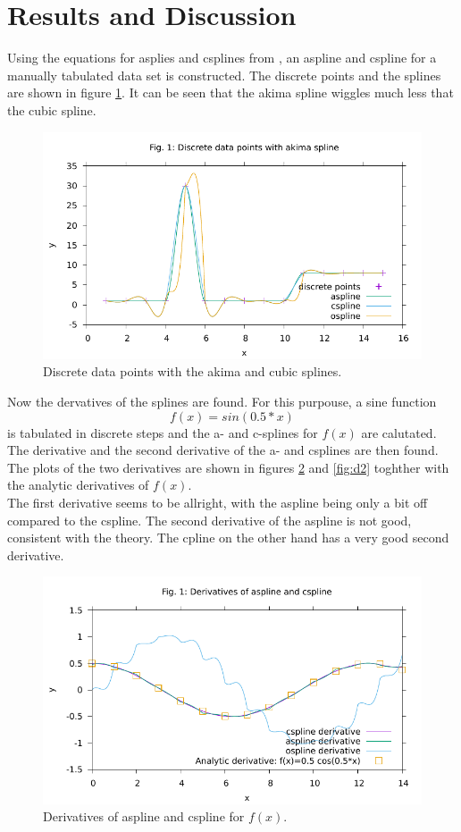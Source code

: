 \documentclass{article}
\begin{document}
\section{Results and Discussion}
Using the equations for asplies and csplines from \cite{Prakprog}, an aspline and cspline for a 
manually tabulated data set is constructed.
The discrete points and the splines are shown in figure \ref{fig:acspl}. It can be seen that the akima spline 
wiggles much less that the cubic spline.

\begin{figure}[h]
\label{fig:acspl}
\includegraphics[width=\linewidth]{splines.pdf}
\caption{Discrete data points with the akima and cubic splines.}
\end{figure} 

Now the dervatives of the splines are found. For this purpouse, a sine function $$f(x) = sin(0.5*x)$$ 
is tabulated in discrete steps and the a- and c-splines for $f(x)$ are calutated.
\\
The derivative and the second derivative of the a- and csplines are then found. The plots of the two 
derivatives are shown in figures \ref{fig:d} and \ref{fig:d2} toghther with the analytic derivatives 
of $f(x)$.
\\
The first derivative seems to be allright, with the aspline being only a bit off compared to the cspline.
The second derivative of the aspline is not good, consistent with the theory. The cpline on the other 
hand has a very good second derivative.
\begin{figure}[h]
\label{fig:d}
\includegraphics[width=\linewidth]{dsplines.pdf}
\caption{Derivatives of aspline and cspline for $f(x)$.}
\end{figure} 
\end{document}
